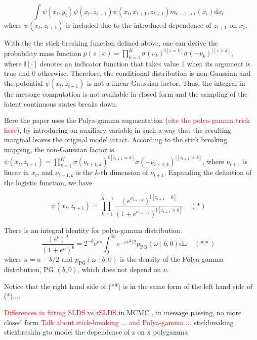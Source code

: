 $$
\int \psi\left(x_{t}, y_{t}\right) \psi\left(x_{t}, z_{t+1}\right) \psi\left(x_{t}, x_{t+1}, z_{t+1}\right) m_{t-1 \rightarrow t}\left(x_{t}\right) \mathrm{d} x_{t}
$$ 
where $\psi\left(x_{t}, z_{t+1}\right)$ is included due to the introduced dependence of $z_{t+1}$ on $x_t$.

With the the stick-breaking function defined above, one can derive the probability mass function $p(z \mid x)=\prod_{k=1}^{K} \sigma\left(\nu_{k}\right)^{\mathbb{I}[z=k]} \sigma\left(-\nu_{k}\right)^{\mathbb{[}[z>k]}
$, where $\mathbb{I}[\cdot]$ denotes an indicator function that takes value 1 when its argument is true and 0 otherwise. Therefore, the conditional distribution is non-Gaussian and the potential $\psi\left(x_{t}, z_{t+1}\right)$ is not a linear Gaussian factor. Thus, the integral in the message computation is not available in closed form and the sampling of the latent continuous states breaks down.

Here the paper uses the Polya-gamma augmentation (\textcolor{red}{cite the polya-gamma trick here}), by introducing an auxiliary variable in such a way that the resulting marginal leaves the original model intact. According to the stick breaking mapping, the non-Gaussian factor is
$\psi\left(x_{t}, z_{t+1}\right)=\prod_{k=1}^{K} \sigma\left(\nu_{t+1, k}\right)^{\mathbb{I}\left[z_{t+1}=k\right]} \sigma\left(-\nu_{t+1, k}\right)^{\mathbb{[}\left[z_{t+1}>k\right]}$, where  $\nu_{t+1}$ is linear in $x_{t}$, and $\nu_{t+1, k}$ is the $k$-th dimension of $\nu_{t+1}$.  Expanding the definition of the logistic function, we have

$$
\psi\left(x_{t}, z_{t+1}\right)=\prod_{k=1}^{K-1} \frac{\left(e^{\nu_{t+1, k}}\right)^{\mathbb{I}\left[z_{t+1}=k\right]}}{\left(1+e^{\nu_{t+1, k}}\right)^{\mathbb{I}\left[z_{t+1} \geq k\right]}} \quad (*)
$$

There is an integral identity for polya-gamma distribution:
$$
\frac{\left(e^{\nu}\right)^{a}}{\left(1+e^{\nu}\right)^{b}}=2^{-b} e^{\kappa \nu} \int_{0}^{\infty} e^{-\omega \nu^{2} / 2} p_{\mathrm{PG}}(\omega \mid b, 0) \mathrm{d} \omega \quad(**)
$$
where $\kappa=a-b / 2$ and $p_{\mathrm{PG}}(\omega \mid b, 0)$ is the density of the Pólya-gamma distribution, PG $(b, 0)$, which does not depend on $\nu$.   

Notice that the right hand side of (**) is in the same form of the left hand side of (*),...


\textcolor{red}{Differences in fitting SLDS vs rSLDS}
in MCMC , in message passing, no more closed form 
\textcolor{red}{Talk about stick-breaking ... and Polya-gamma ...}
stickbreaking
stickbreakin gto model the dependcnce of z on x
polygamma

